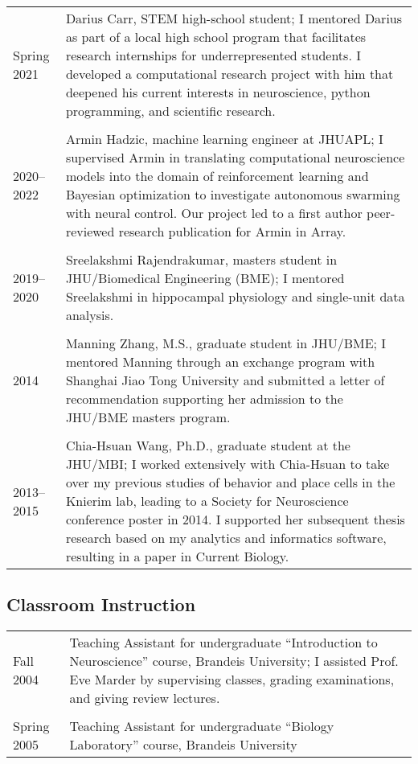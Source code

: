 \documentclass[10pt]{article}
\begin{document}
\begin{longtable}{@{\hspace{0.2in}}l>{\raggedright\arraybackslash}p{}}
  Spring 2021 & Darius Carr, STEM high-school student; I mentored
  Darius as part of a local high school program that facilitates research
  internships for underrepresented students. I developed a computational
  research project with him that deepened his current interests in neuroscience,
  python programming, and scientific research. \\
  \tabularnewline
  2020--2022 \hspace{0.1in} & Armin Hadzic, machine learning engineer at JHUAPL;
  I supervised Armin in translating computational neuroscience models into the
  domain of reinforcement learning and Bayesian optimization to investigate
  autonomous swarming with neural control. Our project led to a first author
  peer-reviewed research publication for Armin in Array. \\
  \tabularnewline
  2019--2020 & Sreelakshmi Rajendrakumar, masters student in
  JHU/Biomedical Engineering (BME); I mentored Sreelakshmi in hippocampal
  physiology and single-unit data analysis. \\
  \tabularnewline
  2014 & Manning Zhang, M.S., graduate student in JHU/BME; I mentored Manning
  through an exchange program with Shanghai Jiao Tong University and submitted
  a letter of recommendation supporting her admission to the JHU/BME masters
  program. \\
  \tabularnewline
  2013--2015 & Chia-Hsuan Wang, Ph.D., graduate student at the JHU/MBI; I worked
  extensively with Chia-Hsuan to take over my previous studies of behavior
  and place cells in the Knierim lab, leading to a Society for Neuroscience
  conference poster in 2014. I supported her subsequent thesis research based
  on my analytics and informatics software, resulting in a paper in Current
  Biology. \\
\end{longtable}

\subsection*{Classroom Instruction}
\label{sec:classroom}

\begin{tabular}{@{\hspace{0.2in}}l>{\raggedright\arraybackslash}p{}}
  Fall 2004 & Teaching Assistant for undergraduate ``Introduction to
  Neuroscience'' course, Brandeis University; I assisted Prof. Eve Marder by
  supervising classes, grading examinations, and giving review lectures.\\
  \tabularnewline
  Spring 2005 \hspace{.1in} & Teaching Assistant for undergraduate ``Biology
  Laboratory'' course, Brandeis University \\
\end{tabular}
\end{document}
